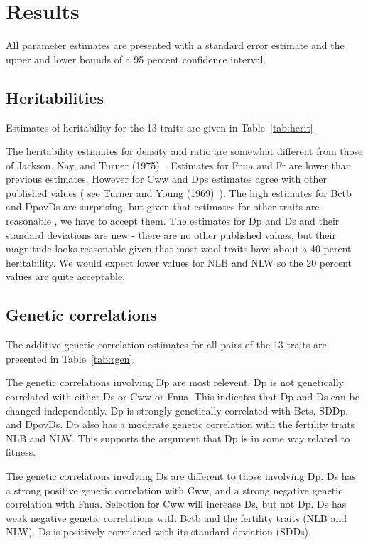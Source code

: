 \documentclass[titlepage]{article}  %
\begin{document}
\section{Results}
All parameter estimates are presented with a standard error estimate and the upper and lower bounds of a 95 percent confidence interval.
\subsection{Heritabilities}
Estimates of heritability for the 13 traits are given in Table~\ref{tab:herit}

The heritability estimates for density and ratio are somewhat different from those of Jackson, Nay, and Turner (1975)~\cite{jack:75}. Estimates for Fnua and Fr are lower than previous estimates. However  for Cww and Dps estimates agree with other published values ( see Turner and Young (1969)~\cite{turn:69}). The high estimates for Bctb and DpovDs are surprising, but given that estimates for other traits are reasonable , we have to accept them. The estimates for Dp and Ds and their standard deviations are new - there are no other published values, but their magnitude looks reasonable given that most wool traits have about a 40 perent heritability. We would expect lower values for NLB and NLW so the 20 percent values are quite acceptable.

\subsection{Genetic correlations}
The additive genetic correlation estimates for all pairs of the 13 traits are presented in Table~\ref{tab:rgen}.

The genetic correlations involving Dp are most relevent. Dp is not genetically correlated with either Ds or Cww or Fnua.  This indicates that Dp and Ds can be changed independently. Dp is strongly genetically correlated with Bcts, SDDp, and DpovDs. Dp also has a moderate genetic correlation with the fertility traits NLB and NLW.  This supports the argument that Dp  is in some way related to fitness.

The genetic correlations involving Ds are different to those involving Dp. Ds has a strong positive genetic correlation with Cww, and a strong negative genetic correlation with Fnua. Selection for Cww will increase Ds, but not Dp. Ds has weak negative genetic correlations with Bctb and the fertility traits (NLB and NLW). Ds is positively correlated with its standard deviation (SDDs).
\end{document}
